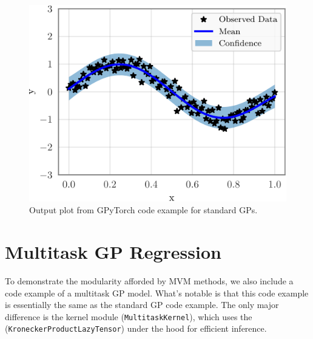 \longcodefalse

\begin{figure}[ht!]
  \centering
  \includegraphics[width=0.5\linewidth]{figures/example_gpytorch_plot.pdf}
  \caption{
    Output plot from GPyTorch code example for standard GPs.
  }
  \label{fig:example_gpytorch_plot}
\end{figure}







\section{Multitask GP Regression}
\label{app:multitask_gp_example}

To demonstrate the modularity afforded by MVM methods, we also include a code example of a multitask GP model.
What's notable is that this code example is essentially the same as the standard GP code example.
The only major difference is the kernel module ({\tt MultitaskKernel}),
which uses the ({\tt KroneckerProductLazyTensor}) under the hood for efficient inference.

